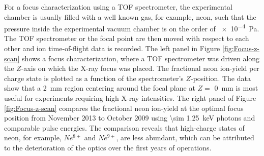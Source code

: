%
For a focus characterization using a TOF spectrometer, the experimental chamber is usually filled with a well known gas, for example, neon, such that the pressure inside the experimental vacuum chamber is on the order of \SI{e-4}{\pascal}. The TOF spectrometer or the focal point are then moved with respect to each other and ion time-of-flight data is recorded. The left panel in Figure \ref{fig:Focus-z-scan} shows a focus characterization, where a TOF spectrometer was driven along the $Z$-axis on which the X-ray focus was placed. The fractional neon ion-yield per charge state is plotted as a function of the spectrometer's $Z$-position. The data show that a \SI{2}{\milli\meter} region centering around the focal plane at $Z=$ \SI{0}{\milli\meter} is most useful for experiments requiring high X-ray intensities. The right panel of Figure \ref{fig:Focus-z-scan} compares the fractional neon ion-yield at the optimal focus position from November \num{2013} \citep{Bucher-2016-Unpublished} to October \num{2009} \citep{Doumy-2011-PRL} using \SI{\sim 1.25}{\kilo\electronvolt} photons and comparable pulse energies. The comparison reveals that high-charge states of neon, for example, $Ne^{8+}$ and $Ne^{9+}$, are less abundant, which can be attributed to the deterioration of the optics over the first years of operations.
%
%
%
